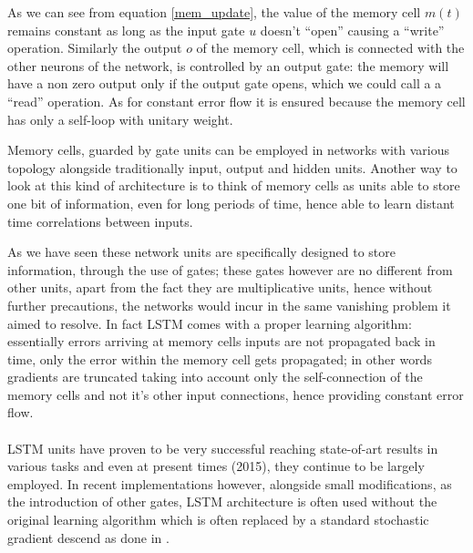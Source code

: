 % 
% 

As we can see from equation \ref{mem_update}, the value of the memory cell $m(t)$ remains constant as long as the input 
gate $u$ doesn't ``open'' causing a ``write'' operation. Similarly the output $o$ of the memory cell, which is 
connected with 
the other neurons of the network, is controlled by an output gate: the memory will have a non zero output only if the 
output gate opens, which we could call a  a ``read'' operation. As for constant error flow it is ensured because the 
memory cell has only a self-loop with unitary weight.

Memory cells, guarded by gate units can be employed in networks with various topology alongside traditionally 
input, output and hidden units. Another way to look at this kind of architecture is to think of memory cells as units 
able to store one bit of information, even for long periods of time, hence able to learn distant time correlations 
between inputs.

As we have seen these network units are specifically designed to store information, through the use of gates; these 
gates however are no different from other units, apart from the fact they are multiplicative units, hence without 
further precautions, the networks would incur in the same vanishing problem it aimed to resolve. In fact LSTM comes with 
a proper learning algorithm: essentially errors arriving at memory cells inputs are not propagated back in time, only 
the error within the memory cell gets propagated; in other words gradients are truncated taking into account only the 
self-connection of the memory cells and not it's other input connections, hence providing constant error flow.
\\\\
LSTM units have proven to be very successful reaching state-of-art results in various tasks and even at present times 
(2015), they continue to be largely
employed. In recent implementations however, alongside small modifications, as the introduction of other gates, LSTM 
architecture is often used without the original learning algorithm which is often replaced by a standard stochastic 
gradient descend as done in \cite{lstmGraves}.







